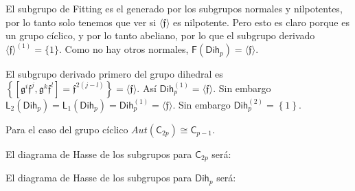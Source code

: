 \documentclass[12pt,a4paper,fleqn,spanish,final,openright]{extbook}
\theoremstyle{definition}
\theoremstyle{remark}
\begin{document}
El subgrupo de Fitting es el generado por los subgrupos normales y nilpotentes, por lo tanto solo tenemos que ver si $\langle \mathfrak{f} \rangle$ es nilpotente. Pero esto es claro porque es un grupo cíclico, y por lo tanto abeliano, por lo que el subgrupo derivado ${\langle \mathfrak{f} \rangle}^{(1)} = \{1\}$. Como no hay otros normales, $\mathsf{F}({\mathsf{Dih}}_{p})=\langle \mathfrak{f} \rangle$.

El subgrupo derivado primero del grupo dihedral es $\left\{ \left[ \mathfrak{g}^{i}\mathfrak{f}^{j},\mathfrak{g}^{k}\mathfrak{f}^{l} \right]=\mathfrak{f}^{2(j-l)} \right\} = \langle \mathfrak{f} \rangle$. Así $\mathsf{Dih}_{p}^{(1)} = \langle \mathfrak{f} \rangle$. Sin embargo ${\mathsf{L}}_{2}\left( {\mathsf{Dih}}_{p}
\right) = {\mathsf{L}}_{1}\left( {\mathsf{Dih}}_{p} \right) = \mathsf{Dih}_{p}^{(1)} = \langle \mathfrak{f} \rangle$.
 Sin embargo ${\mathsf{Dih}}_{p}^{(2)} = \left\{1\right\}$.
 

Para el caso del grupo cíclico $Aut(\mathsf{C}_{2p})\cong \mathsf{C}_{p-1}$.


El diagrama de Hasse de los subgrupos para $\mathsf{C}_{2p}$ será:

\begin{center}
\end{center}

El diagrama de Hasse de los subgrupos para $\mathsf{Dih}_{p}$ será:
\end{document}
